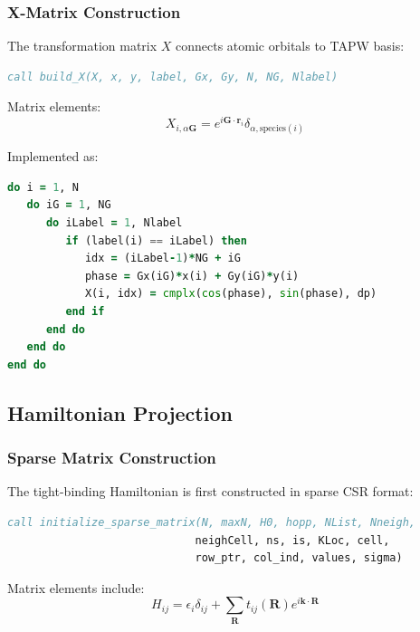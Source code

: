\documentclass[11pt,a4paper]{article}
\begin{document}
\subsubsection{X-Matrix Construction}

The transformation matrix $X$ connects atomic orbitals to TAPW basis:

\begin{lstlisting}[language=Fortran,caption=X-Matrix Construction]
call build_X(X, x, y, label, Gx, Gy, N, NG, Nlabel)
\end{lstlisting}

Matrix elements:
\begin{equation}
X_{i,\alpha\mathbf{G}} = e^{i\mathbf{G} \cdot \mathbf{r}_i} \delta_{\alpha,\text{species}(i)}
\end{equation}

Implemented as:
\begin{lstlisting}[language=Fortran,caption=X-Matrix Elements]
do i = 1, N
   do iG = 1, NG
      do iLabel = 1, Nlabel
         if (label(i) == iLabel) then
            idx = (iLabel-1)*NG + iG
            phase = Gx(iG)*x(i) + Gy(iG)*y(i)
            X(i, idx) = cmplx(cos(phase), sin(phase), dp)
         end if
      end do
   end do
end do
\end{lstlisting}

\subsection{Hamiltonian Projection}

\subsubsection{Sparse Matrix Construction}

The tight-binding Hamiltonian is first constructed in sparse CSR format:

\begin{lstlisting}[language=Fortran,caption=Sparse Hamiltonian]
call initialize_sparse_matrix(N, maxN, H0, hopp, NList, Nneigh, 
                             neighCell, ns, is, KLoc, cell, 
                             row_ptr, col_ind, values, sigma)
\end{lstlisting}

Matrix elements include:
\begin{equation}
H_{ij} = \epsilon_i \delta_{ij} + \sum_{\mathbf{R}} t_{ij}(\mathbf{R}) e^{i\mathbf{k} \cdot \mathbf{R}}
\end{equation}
\end{document}
